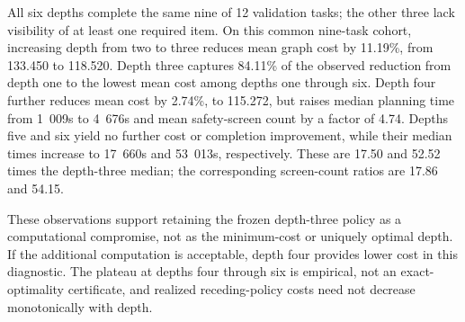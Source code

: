All six depths complete the same nine of 12 validation tasks; the other three lack visibility of at least one required item. On this common nine-task cohort, increasing depth from two to three reduces mean graph cost by 11.19\%, from 133.450 to 118.520. Depth three captures 84.11\% of the observed reduction from depth one to the lowest mean cost among depths one through six. Depth four further reduces mean cost by 2.74\%, to 115.272, but raises median planning time from \unit{1.009}{s} to \unit{4.676}{s} and mean safety-screen count by a factor of 4.74. Depths five and six yield no further cost or completion improvement, while their median times increase to \unit{17.660}{s} and \unit{53.013}{s}, respectively. These are 17.50 and 52.52 times the depth-three median; the corresponding screen-count ratios are 17.86 and 54.15.

These observations support retaining the frozen depth-three policy as a computational compromise, not as the minimum-cost or uniquely optimal depth. If the additional computation is acceptable, depth four provides lower cost in this diagnostic. The plateau at depths four through six is empirical, not an exact-optimality certificate, and realized receding-policy costs need not decrease monotonically with depth.
